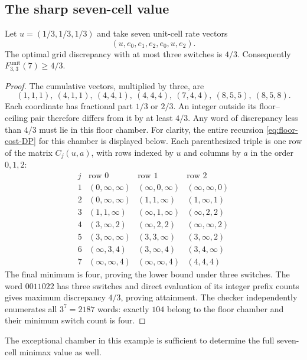 \subsection{The sharp seven-cell value}
\begin{proposition}\label{prop:seven-cell-instance}
Let $u=(1/3,1/3,1/3)$ and take seven unit-cell rate vectors
\begin{equation}\label{eq:seven-cell-rates}
 (u,e_0,e_1,e_2,e_0,u,e_2).
\end{equation}
The optimal grid discrepancy with at most three switches is $4/3$.
Consequently $F^{\mathrm{unit}}_{3,3}(7)\ge4/3$.
\end{proposition}
\begin{proof}
The cumulative vectors, multiplied by three, are
\[
 (1,1,1),\ (4,1,1),\ (4,4,1),\ (4,4,4),\
 (7,4,4),\ (8,5,5),\ (8,5,8).
\]
Each coordinate has fractional part $1/3$ or $2/3$. An integer outside
its floor--ceiling pair therefore differs from it by at least $4/3$.
Any word of discrepancy less than $4/3$ must lie in this floor chamber.
For clarity, the entire recursion \eqref{eq:floor-cost-DP} for this chamber
is displayed below. Each parenthesized triple is one row of the matrix
$C_j(u,a)$, with rows indexed by $u$ and columns by $a$ in the order
$0,1,2$:
\[
\begin{array}{c|ccc}
 j&\text{row }0&\text{row }1&\text{row }2\\\hline
1&(0,\infty,\infty)&(\infty,0,\infty)&(\infty,\infty,0)\\
2&(0,\infty,\infty)&(1,1,\infty)&(1,\infty,1)\\
3&(1,1,\infty)&(\infty,1,\infty)&(\infty,2,2)\\
4&(3,\infty,2)&(\infty,2,2)&(\infty,\infty,2)\\
5&(3,\infty,\infty)&(3,3,\infty)&(3,\infty,2)\\
6&(\infty,3,4)&(3,\infty,4)&(3,4,\infty)\\
7&(\infty,\infty,4)&(\infty,\infty,4)&(4,4,4)
\end{array}
\]
The final minimum is four, proving the lower bound under three switches.
The word $0011022$ has three switches and direct evaluation of its integer
prefix counts gives maximum discrepancy $4/3$, proving attainment.
The checker independently enumerates all $3^7=2187$ words: exactly
$104$ belong to the floor chamber and their minimum switch count is four.
\end{proof}
The exceptional chamber in this example is sufficient to determine the
full seven-cell minimax value as well.

